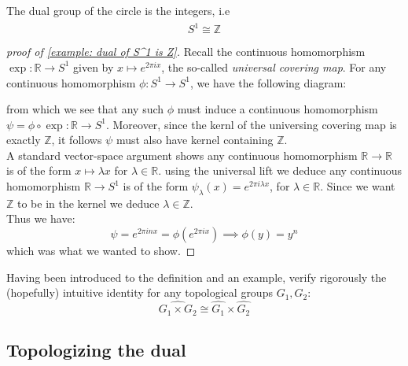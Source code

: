\documentclass[11pt, x11names]{article}
\newcommand{\zz}{\mathbb{Z}}
\newcommand{\rr}{\mathbb{R}}
\renewcommand{\hat}{\widehat}
\begin{document}
\begin{example}
\label{example: dual of S^1 is Z}
    The dual group of the circle is the integers, i.e
    \begin{equation*}
        \hat{S^1} \cong \zz
    \end{equation*}
\end{example}

\begin{proof}[proof of \ref{example: dual of S^1 is Z}]
Recall the continuous homomorphism $\exp: \rr \to S^1$ given by $x \mapsto e^{2 \pi i x}$, the so-called \textit{universal covering map}. For any continuous homomorphism $\phi: S^1 \to S^1$, we have the following diagram:
\begin{center}
\end{center} 
from which we see that any such $\phi$ must induce a continuous homomorphism $\psi = \phi \circ \exp: \rr \to S^1$. Moreover, since the kernl of the universing covering map is exactly $\zz$, it follows $\psi$ must also have kernel containing $\zz$. \\
A standard vector-space argument shows any continuous homomorphism  $\rr \to \rr$ is of the form $x \mapsto \lambda x$ for $\lambda \in \rr$. using the universal lift we deduce any continuous homomorphism $\rr \to S^1$ is of the form $\psi_\lambda(x) = e^{2 \pi i \lambda x}$, for $\lambda \in \rr$. Since we want $\zz$ to be in the kernel we deduce $\lambda \in \zz$.\\
Thus we have:
\begin{equation*}
    \psi = e^{2 \pi i n x} = \phi (e^{2 \pi i x}) \implies \phi(y) = y^n
\end{equation*}
which was what we wanted to show.
\end{proof}

\begin{sanitycheck}
Having been introduced to the definition and an example, verify rigorously the (hopefully) intuitive identity for any topological groups $G_1, G_2$:
\begin{equation*}
    \widehat{G_1 \times G_2} \cong \hat{G_1} \times \hat{G_2}
\end{equation*}
\end{sanitycheck}

\subsection{Topologizing the dual}
\label{subsection: Topologizing the dual}
\end{document}
